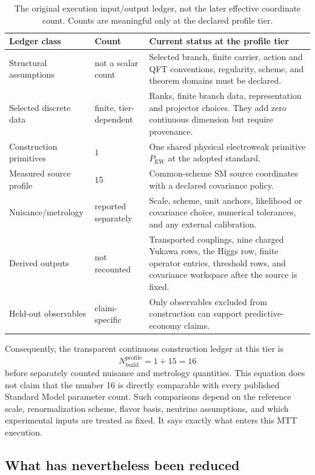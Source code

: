 \documentclass[11pt]{article}
\newcommand{\PEW}{P_{\mathrm{EW}}}
\begin{document}
\begin{table}[ht]
\centering
\small
\begin{tabularx}{\textwidth}{@{}p{3.2cm}p{1.9cm}X@{}}
\toprule
Ledger class & Count & Current status at the profile tier \\
\midrule
Structural assumptions & not a scalar count &
Selected branch, finite carrier, action and QFT conventions, regularity,
scheme, and theorem domains must be declared. \\
Selected discrete data & finite, tier-dependent &
Ranks, finite branch data, representation and projector choices. They add
zero continuous dimension but require provenance. \\
Construction primitives & \(1\) &
One shared physical electroweak primitive \(\PEW\) at the adopted standard. \\
Measured source profile & \(15\) &
Common-scheme SM source coordinates with a declared covariance policy. \\
Nuisance/metrology & reported separately &
Scale, scheme, unit anchors, likelihood or covariance choice, numerical
tolerances, and any external calibration. \\
Derived outputs & not recounted &
Transported couplings, nine charged Yukawa rows, the Higgs row, finite
operator entries, threshold rows, and covariance workspace after the source
is fixed. \\
Held-out observables & claim-specific &
Only observables excluded from construction can support predictive-economy
claims. \\
\bottomrule
\end{tabularx}
\caption{The original execution input/output ledger, not the later effective
coordinate count. Counts are meaningful only at the declared profile tier.}
\label{tab:current-ledger}
\end{table}

Consequently, the transparent continuous construction ledger at this tier is
\[
N_{\mathrm{build}}^{\mathrm{profile}}=1+15=16
\]
before separately counted nuisance and metrology quantities. This equation
does not claim that the number 16 is directly comparable with every published
Standard Model parameter count. Such comparisons depend on the reference
scale, renormalization scheme, flavor basis, neutrino assumptions, and which
experimental inputs are treated as fixed. It says exactly what enters this
MTT execution.

\subsection{What has nevertheless been reduced}
\end{document}
